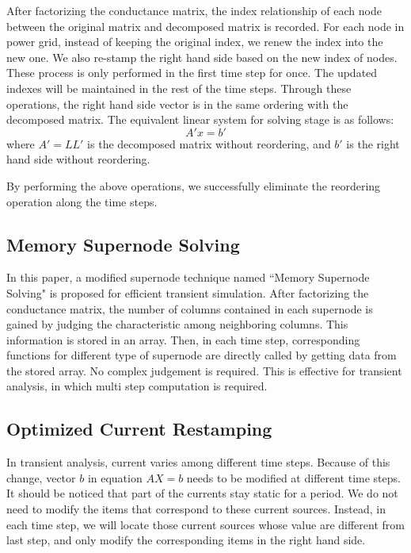 After factorizing the conductance matrix, the index relationship of each node between the original matrix and decomposed matrix is recorded. For each node in power grid, instead of keeping the original index, we renew the index into the new one. We also re-stamp the right hand side based on the new index of nodes. These process is only performed in the first time step for once. The updated indexes will be maintained in the rest of the time steps. Through these operations, the right hand side vector is
in the same ordering with the decomposed matrix. The equivalent linear system for solving stage is as follows:
\begin{equation}
A'x = b'
\end{equation}
where $A'=LL'$ is the decomposed matrix without reordering, and $b'$ is the right hand side without reordering.

By performing the above operations, we successfully eliminate the reordering operation along the time steps.

  \subsection{Memory Supernode Solving}
In this paper, a modified supernode technique named ``Memory Supernode Solving" is proposed for efficient transient simulation. After 
factorizing the conductance matrix, the number of columns contained in each supernode is gained by judging the characteristic among 
neighboring columns. This information is stored in an array. Then, in each time step, corresponding functions for different type of 
supernode are directly called by getting data from the stored array. No complex judgement is required. This is effective for transient
analysis, in which multi step computation is required.  
  \subsection{Optimized Current Restamping}
In transient analysis, current varies among different time steps. Because of this change, vector $b$ in equation $AX=b$ needs to be 
modified at different time steps. It should be noticed that part of the currents stay static for a period. We do not need to modify
the items that correspond to these current sources. Instead, in each time step, we will locate those current sources whose value are
different from last step, and only modify the corresponding items in the right hand side. 
